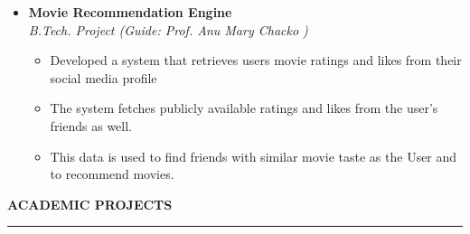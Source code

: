 \documentclass[a4paper,10pt]{article}
\newcommand{\isep}{-2 pt}
\newcommand{\lsep}{-0.5cm}
\newcommand{\resheading}[1]{{\small
        {
            \begin{minipage}
                {0.975\textwidth}\textbf{{\textsc{#1 \vphantom{p\^{E}} }}}
                \\[-0.3cm]
                \hrule
            \end{minipage}
            \\[-0.5cm]
        }
 }}
\begin{document}
\begin{itemize}
\item \textbf{Movie Recommendation Engine}  \\
 {\emph{B.Tech. Project (Guide: Prof. Anu Mary Chacko )}} 
    \\[-0.6cm]
 	\begin{itemize}\itemsep \isep
	\item Developed a system that retrieves users movie ratings and likes from their social media profile
	\item The system fetches publicly available ratings and likes from the user's friends as well.
  	\item This data is used to find friends with similar movie taste as the User and to recommend movies.
	\end{itemize}
	
\end{itemize}
\vspace{0.5cm}
\resheading{\textbf{\large ACADEMIC PROJECTS}}\\[\lsep]
\\[-0.4cm]
\end{document}

